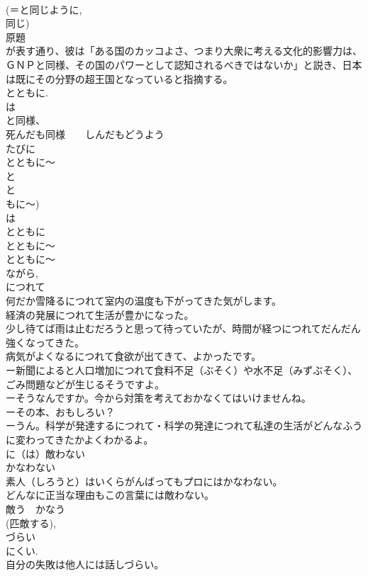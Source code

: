 \documentclass[8pt]{extreport}
\begin{document}
\begin{CJK}{UTF8}{min}
\\	(＝と同じように, 
\\	同じ)
\\	原題
\\	が表す通り、彼は「ある国のカッコよさ、つまり大衆に考える文化的影響力は、ＧＮＰと同様、その国のパワーとして認知されるべきではないか」と説き、日本は既にその分野の超王国となっていると指摘する。
\\	とともに.
\\	は
\\	と同様、
\\	死んだも同様　　しんだもどうよう
\\	たびに
\\	とともに～
\\	と 
\\	と
\\	もに～)
\\	は
\\	とともに
\\	とともに～
\\	とともに～
\\	ながら, 
\\	につれて
\\	何だか雪降るにつれて室内の温度も下がってきた気がします。
\\	経済の発展につれて生活が豊かになった。
\\	少し待てば雨は止むだろうと思って待っていたが、時間が経つにつれてだんだん強くなってきた。
\\	病気がよくなるにつれて食欲が出てきて、よかったです。
\\	ー新聞によると人口増加につれて食料不足（ぶそく）や水不足（みずぶそく）、ごみ問題などが生じるそうですよ。
\\	ーそうなんですか。今から対策を考えておかなくてはいけませんね。
\\	ーその本、おもしろい？
\\	ーうん。科学が発達するにつれて・科学の発達につれて私達の生活がどんなふうに変わってきたかよくわかるよ。	
\\	に（は）敵わない
\\	かなわない
\\	素人（しろうと）はいくらがんばってもプロにはかなわない。
\\	どんなに正当な理由もこの言葉には敵わない。
\\	敵う　かなう
\\	(匹敵する), 
\\	づらい
\\	にくい.
\\	自分の失敗は他人には話しづらい。

\end{CJK}
\end{document}
